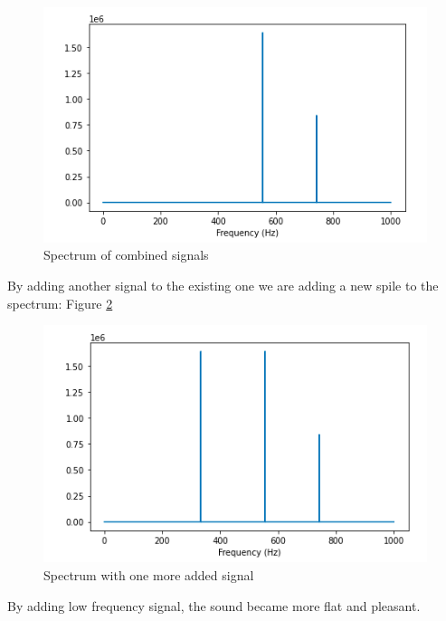 \documentclass[a4paper]{article}
\begin{document}
         \begin{figure}[H]
            \centering
            \includegraphics[width=\textwidth]{img/cos_sin_spec.png}
            \caption{Spectrum of combined signals}
            \label{fig:cos_sin_spec}
        \end{figure}
            
        By adding another signal to the existing one we are adding a new spile to the spectrum: Figure \ref{fig:cos_sin_new_sig}
        
        \begin{figure}[H]
            \centering
            \includegraphics[width=\textwidth]{img/cos_sin_new_sig.png}
            \caption{Spectrum with one more added signal}
            \label{fig:cos_sin_new_sig}
        \end{figure}
            
        By adding low frequency signal, the sound became more flat and pleasant.
            
\end{document}
